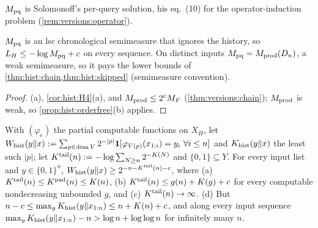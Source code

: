 $M_{\mathrm{pq}}$ is Solomonoff's per-query solution, his eq.~(10) for the operator-induction problem (\cref{rem:versions:operator}).

\begin{proposition}\label{prop:hist:operator}
$M_{\mathrm{pq}}$ is an lsc chronological semimeasure that ignores the history, so $L_{H}\le-\log M_{\mathrm{pq}}+c$ on every sequence. On distinct inputs $M_{\mathrm{pq}}=M_{\mathrm{prod}}(D_n)$, a weak semimeasure, so it pays the lower bounds of \cref{thm:hist:chain,thm:hist:skipped} (semimeasure convention).
\end{proposition}

\begin{proof}
(a), \cref{cor:hist:H4}(a), and $M_{\mathrm{prod}}\le2^cM_{F}$ (\cref{thm:versions:chain}); $M_{\mathrm{prod}}$ is weak, so \cref{prop:hist:orderfree}(b) applies.
\end{proof}

\begin{proposition}\label{prop:hist:programs}
With $(\varphi_e)$ the partial computable functions on $X_H$, let $W_{\mathrm{hist}}(y\Vert x):=\sum_{p\in\operatorname{dom} V}2^{-|p|}\mathbf{1}[\varphi_{V(p)}(x_{1:i})=y_i\ \forall i\le n]$ and $K_{\mathrm{hist}}(y\Vert x)$ the least such $|p|$; let $K^{\mathrm{tail}}(n):=-\log\sum_{N\ge n}2^{-K(N)}$ and $\{0,1\}\subseteq Y$. For every input list and $y\in\{0,1\}^n$, $W_{\mathrm{hist}}(y\Vert x)\ge2^{-n-K^{\mathrm{tail}}(n)-c}$, where (a) $K^{\mathrm{tail}}(n)\le K^{\mathrm{pad}}(n)\le K(n)$, (b) $K^{\mathrm{tail}}(n)\le g(n)+K(g)+c$ for every computable nondecreasing unbounded $g$, and (c) $K^{\mathrm{tail}}(n)\to\infty$. (d) But $n-c\le\max_yK_{\mathrm{hist}}(y\Vert x_{1:n})\le n+K(n)+c$, and along every input sequence $\max_yK_{\mathrm{hist}}(y\Vert x_{1:n})-n>\log n+\log\log n$ for infinitely many $n$.
\end{proposition}

